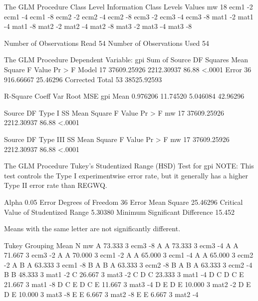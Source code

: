 \documentclass{article}
\begin{document}
\begin{Woutput}
The GLM Procedure
                                      Class Level Information
Class       Levels  Values
mw              18  ecm1    -2 ecm1    -4 ecm1    -8 ecm2    -2 ecm2    -4 ecm2    -8 ecm3    -2
                    ecm3    -4 ecm3    -8 mat1    -2 mat1    -4 mat1    -8 mat2    -2 mat2    -4
                    mat2    -8 mat3    -2 mat3    -4 mat3    -8

Number of Observations Read          54
Number of Observations Used          54

The GLM Procedure
Dependent Variable: gpi
                                        Sum of
Source                      DF         Squares     Mean Square    F Value    Pr > F
Model                       17     37609.25926      2212.30937      86.88    <.0001
Error                       36       916.66667        25.46296
Corrected Total             53     38525.92593

R-Square     Coeff Var      Root MSE      gpi Mean
0.976206      11.74520      5.046084      42.96296

Source                      DF       Type I SS     Mean Square    F Value    Pr > F
mw                          17     37609.25926      2212.30937      86.88    <.0001

Source                      DF     Type III SS     Mean Square    F Value    Pr > F
mw                          17     37609.25926      2212.30937      86.88    <.0001

The GLM Procedure
Tukey's Studentized Range (HSD) Test for gpi
NOTE: This test controls the Type I experimentwise error rate, but it generally has a higher Type
II error rate than REGWQ.

Alpha                                   0.05
Error Degrees of Freedom                  36
Error Mean Square                   25.46296
Critical Value of Studentized Range  5.30380
Minimum Significant Difference        15.452

Means with the same letter are not significantly different.

   Tukey
 Grouping            Mean      N    mw
     A             73.333      3    ecm3    -8
     A
     A             73.333      3    ecm3    -4
     A
     A             71.667      3    ecm3    -2
     A
     A             70.000      3    ecm1    -2
     A
     A             65.000      3    ecm1    -4
     A
     A             65.000      3    ecm2    -2
     A
B    A             63.333      3    ecm1    -8
B    A
B    A             63.333      3    ecm2    -8
B    A
B    A             63.333      3    ecm2    -4
B
B                  48.333      3    mat1    -2
     C             26.667      3    mat3    -2
     C
D    C             23.333      3    mat1    -4
D    C
D    C    E        21.667      3    mat1    -8
D    C    E
D    C    E        11.667      3    mat3    -4
D         E
D         E        10.000      3    mat2    -2
D         E
D         E        10.000      3    mat3    -8
          E
          E         6.667      3    mat2    -8
          E
          E         6.667      3    mat2    -4
\end{Woutput}
\end{document}
